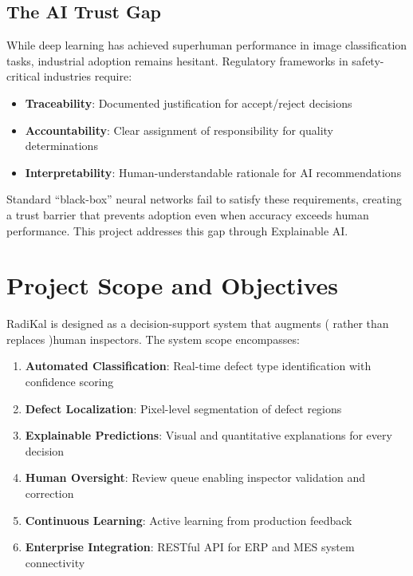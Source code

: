 \documentclass[12pt,a4paper]{report}
\begin{document}
\subsection{The AI Trust Gap}

While deep learning has achieved superhuman performance in image classification tasks, industrial adoption remains hesitant. Regulatory frameworks in safety-critical industries require:

\begin{itemize}
    \item \textbf{Traceability}: Documented justification for accept/reject decisions
    \item \textbf{Accountability}: Clear assignment of responsibility for quality determinations
    \item \textbf{Interpretability}: Human-understandable rationale for AI recommendations
\end{itemize}

Standard ``black-box'' neural networks fail to satisfy these requirements, creating a trust barrier that prevents adoption even when accuracy exceeds human performance. This project addresses this gap through Explainable AI.

\section{Project Scope and Objectives}

RadiKal is designed as a decision-support system that augments ( rather than replaces )human inspectors. The system scope encompasses:

\begin{enumerate}
    \item \textbf{Automated Classification}: Real-time defect type identification with confidence scoring
    \item \textbf{Defect Localization}: Pixel-level segmentation of defect regions
    \item \textbf{Explainable Predictions}: Visual and quantitative explanations for every decision
    \item \textbf{Human Oversight}: Review queue enabling inspector validation and correction
    \item \textbf{Continuous Learning}: Active learning from production feedback
    \item \textbf{Enterprise Integration}: RESTful API for ERP and MES system connectivity
\end{enumerate}
\end{document}
